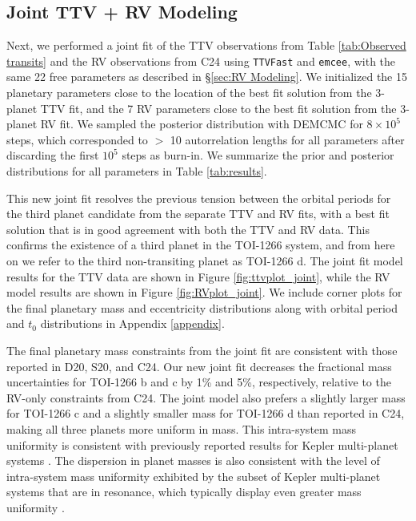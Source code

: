 \documentclass[twocolumn]{aastex631}
\begin{document}
\subsection{Joint TTV + RV Modeling}   \label{sec:Joint TTV RV Modeling}

Next, we performed a joint fit of the TTV observations from Table \ref{tab:Observed transits} and the RV observations from C24 using \texttt{TTVFast} and \texttt{emcee}, with the same 22 free parameters as described in \S\ref{sec:RV Modeling}. We initialized the 15 planetary parameters close to the location of the best fit solution from the 3-planet TTV fit, and the 7 RV parameters close to the best fit solution from the 3-planet RV fit. We sampled the posterior distribution with DEMCMC for $8\times10^5$ steps, which corresponded to $>$ 10 autorrelation lengths for all parameters after discarding the first $10^5$ steps as burn-in. We summarize the prior and posterior distributions for all parameters in Table \ref{tab:results}. 

This new joint fit resolves the previous tension between the orbital periods for the third planet candidate from the separate TTV and RV fits, with a best fit solution that is in good agreement with both the TTV and RV data. This confirms the existence of a third planet in the TOI-1266 system, and from here on we refer to the third non-transiting planet as TOI-1266 d. The joint fit model results for the TTV data are shown in Figure \ref{fig:ttvplot_joint}, while the RV model results are shown in Figure \ref{fig:RVplot_joint}. We include corner plots for the final planetary mass and eccentricity distributions along with orbital period and $t_0$ distributions in Appendix \ref{appendix}.

The final planetary mass constraints from the joint fit are consistent with those reported in D20, S20, and C24. Our new joint fit decreases the  fractional mass uncertainties for TOI-1266 b and c by 1\% and 5\%, respectively, relative to the RV-only constraints from C24. The joint model also prefers a slightly larger mass for TOI-1266 c and a slightly smaller mass for TOI-1266 d than reported in C24, making all three planets more uniform in mass. This intra-system mass uniformity is consistent with previously reported results for Kepler multi-planet systems \citep[``peas-in-a-pod''; e.g.,][]{Millholland_2017,Weiss2018,Millholland2022,Otegi2022,Goyal2023,Goyal_Wang2024,Rice2024}. The dispersion in planet masses is also consistent with the level of intra-system mass uniformity exhibited by the subset of Kepler multi-planet systems that are in resonance, which typically display even greater mass uniformity \citep{Goldberg_2022}. 
\end{document}
